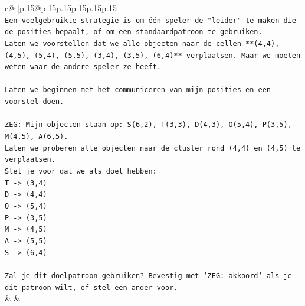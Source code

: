 \documentclass{article}
\begin{document}
{\begin{supertabular}{c@{$\;$}|p{.15\linewidth}@{}p{.15\linewidth}p{.15\linewidth}p{.15\linewidth}p{.15\linewidth}p{.15\linewidth}}
{{{\\ 
\texttt{Een veelgebruikte strategie is om één speler de "leider" te maken die de posities bepaalt, of om een standaardpatroon te gebruiken.} \\
\texttt{Laten we voorstellen dat we alle objecten naar de cellen **(4,4), (4,5), (5,4), (5,5), (3,4), (3,5), (6,4)** verplaatsen. Maar we moeten weten waar de andere speler ze heeft.} \\
\\ 
\texttt{Laten we beginnen met het communiceren van mijn posities en een voorstel doen.} \\
\\ 
\texttt{ZEG: Mijn objecten staan op: S(6,2), T(3,3), D(4,3), O(5,4), P(3,5), M(4,5), A(6,5).} \\
\texttt{Laten we proberen alle objecten naar de cluster rond (4,4) en (4,5) te verplaatsen.} \\
\texttt{Stel je voor dat we als doel hebben:} \\
\texttt{T {-}> (3,4)} \\
\texttt{D {-}> (4,4)} \\
\texttt{O {-}> (5,4)} \\
\texttt{P {-}> (3,5)} \\
\texttt{M {-}> (4,5)} \\
\texttt{A {-}> (5,5)} \\
\texttt{S {-}> (6,4)} \\
\\ 
\texttt{Zal je dit doelpatroon gebruiken? Bevestig met `ZEG: akkoord` als je dit patroon wilt, of stel een ander voor.} \\
            }
        }
    }
    & & \\ \\


\end{supertabular}}
\end{document}

